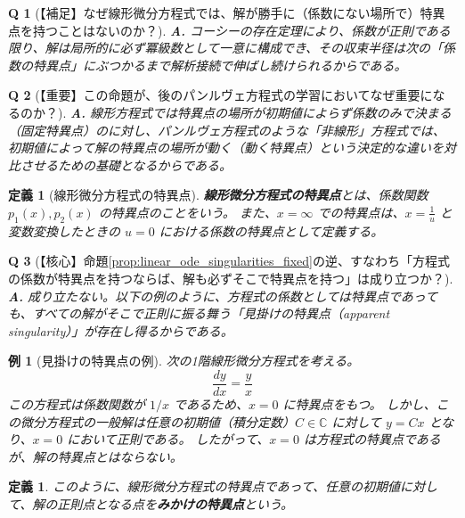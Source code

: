 \documentclass[paper=a4, fontsize=11pt]{jlreq} %
\theoremstyle{break}
\newtheorem{definition}[theorem]{定義}
\newtheorem{example}[theorem]{例}
\theoremstyle{qa}
\newtheorem*{Q}{Q}
\theoremstyle{remark} %
\begin{document}
\begin{Q}[【補足】なぜ線形微分方程式では、解が勝手に（係数にない場所で）特異点を持つことはないのか？]
\textbf{A.} コーシーの存在定理により、係数が正則である限り、解は局所的に必ず冪級数として一意に構成でき、その収束半径は次の「係数の特異点」にぶつかるまで解析接続で伸ばし続けられるからである。
\end{Q}

\begin{Q}[【重要】この命題が、後のパンルヴェ方程式の学習においてなぜ重要になるのか？]
\textbf{A.} 線形方程式では特異点の場所が初期値によらず係数のみで決まる（固定特異点）のに対し、パンルヴェ方程式のような「非線形」方程式では、初期値によって解の特異点の場所が動く（動く特異点）という決定的な違いを対比させるための基礎となるからである。
\end{Q}

\begin{definition}[線形微分方程式の特異点]\label{def:linear_equation_singularity}
    \textbf{線形微分方程式の特異点}とは、係数関数 $p_{1}(x), p_{2}(x)$ の特異点のことをいう。
    また、$x=\infty$ での特異点は、$x=\frac{1}{u}$ と変数変換したときの $u=0$ における係数の特異点として定義する。
\end{definition}

\begin{Q}[【核心】命題\ref{prop:linear_ode_singularities_fixed}の逆、すなわち「方程式の係数が特異点を持つならば、解も必ずそこで特異点を持つ」は成り立つか？]
\textbf{A.} 成り立たない。以下の例のように、方程式の係数としては特異点であっても、すべての解がそこで正則に振る舞う「見掛けの特異点（apparent singularity）」が存在し得るからである。
\end{Q}

\begin{example}[見掛けの特異点の例]\label{ex:apparent_singularity}
    次の1階線形微分方程式を考える。
    \begin{equation}\label{eq:apparent_ex}
    \frac{dy}{dx}=\frac{y}{x}
    \end{equation}
    この方程式は係数関数が $1/x$ であるため、$x=0$ に特異点をもつ。
    しかし、この微分方程式の一般解は任意の初期値（積分定数）$C \in \mathbb{C}$ に対して $y=Cx$ となり、$x=0$ において正則である。
    したがって、$x=0$ は方程式の特異点であるが、解の特異点とはならない。
\end{example}

\begin{definition}
    このように、線形微分方程式の特異点であって、任意の初期値に対して、解の正則点となる点を\textbf{みかけの特異点}という。
\end{definition}
\end{document}
